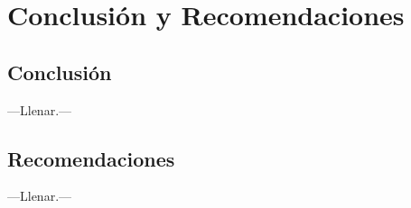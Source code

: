 \chapter{Conclusión y Recomendaciones}

\section{Conclusión}

---Llenar.---

\section{Recomendaciones}

---Llenar.---